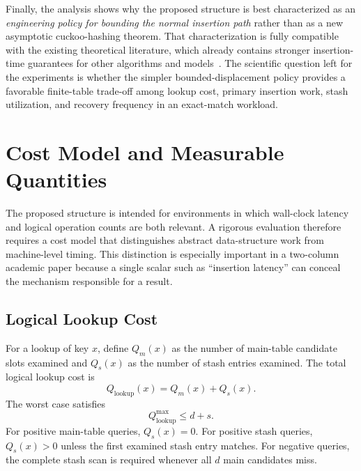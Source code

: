 \documentclass[conference]{IEEEtran}
\begin{document}
Finally, the analysis shows why the proposed structure is best characterized as an \emph{engineering policy for bounding the normal insertion path} rather than as a new asymptotic cuckoo-hashing theorem. That characterization is fully compatible with the existing theoretical literature, which already contains stronger insertion-time guarantees for other algorithms and models~\cite{arbitman2009deamortized,walzer2022insertion,bell2024constant,kuszmaul2025bubbling}. The scientific question left for the experiments is whether the simpler bounded-displacement policy provides a favorable finite-table trade-off among lookup cost, primary insertion work, stash utilization, and recovery frequency in an exact-match workload.


\section{Cost Model and Measurable Quantities}

The proposed structure is intended for environments in which wall-clock latency and logical operation counts are both relevant. A rigorous evaluation therefore requires a cost model that distinguishes abstract data-structure work from machine-level timing. This distinction is especially important in a two-column academic paper because a single scalar such as ``insertion latency'' can conceal the mechanism responsible for a result.

\subsection{Logical Lookup Cost}

For a lookup of key $x$, define $Q_m(x)$ as the number of main-table candidate slots examined and $Q_s(x)$ as the number of stash entries examined. The total logical lookup cost is
\begin{equation}
    Q_{\mathrm{lookup}}(x)=Q_m(x)+Q_s(x).
    \label{eq:q-lookup}
\end{equation}
The worst case satisfies
\begin{equation}
    Q_{\mathrm{lookup}}^{\max}\le d+s.
    \label{eq:q-lookup-max}
\end{equation}
For positive main-table queries, $Q_s(x)=0$. For positive stash queries, $Q_s(x)>0$ unless the first examined stash entry matches. For negative queries, the complete stash scan is required whenever all $d$ main candidates miss.
\end{document}
